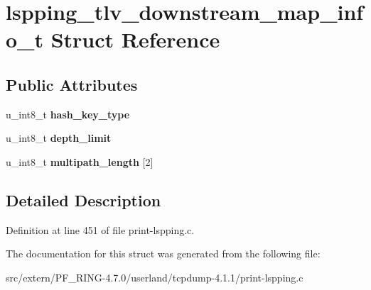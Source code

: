 \hypertarget{structlspping__tlv__downstream__map__info__t}{
\section{lspping\_\-tlv\_\-downstream\_\-map\_\-info\_\-t Struct Reference}
\label{structlspping__tlv__downstream__map__info__t}
}
\subsection*{Public Attributes}
\begin{DoxyCompactItemize}
\item 
\hypertarget{structlspping__tlv__downstream__map__info__t_a47d1092c73ec4b456a2f85c4bc5cb0ef}{
u\_\-int8\_\-t {\bfseries hash\_\-key\_\-type}}
\label{structlspping__tlv__downstream__map__info__t_a47d1092c73ec4b456a2f85c4bc5cb0ef}

\item 
\hypertarget{structlspping__tlv__downstream__map__info__t_a582b15c247519651ffa44c29e0539801}{
u\_\-int8\_\-t {\bfseries depth\_\-limit}}
\label{structlspping__tlv__downstream__map__info__t_a582b15c247519651ffa44c29e0539801}

\item 
\hypertarget{structlspping__tlv__downstream__map__info__t_a42a9a8b31a893dd736a6c040d8be4e01}{
u\_\-int8\_\-t {\bfseries multipath\_\-length} \mbox{[}2\mbox{]}}
\label{structlspping__tlv__downstream__map__info__t_a42a9a8b31a893dd736a6c040d8be4e01}

\end{DoxyCompactItemize}


\subsection{Detailed Description}


Definition at line 451 of file print-\/lspping.c.



The documentation for this struct was generated from the following file:\begin{DoxyCompactItemize}
\item 
src/extern/PF\_\-RING-\/4.7.0/userland/tcpdump-\/4.1.1/print-\/lspping.c\end{DoxyCompactItemize}
